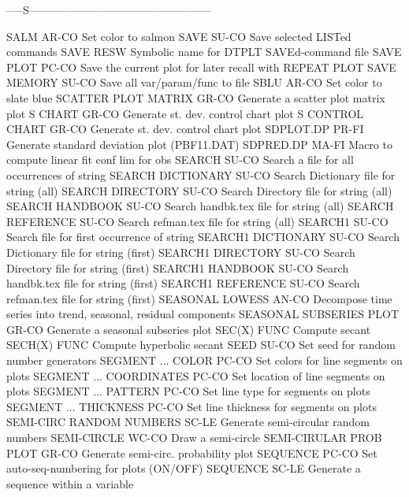 -----S--------------------------------------------------

SALM                        AR-CO Set color to salmon
SAVE                        SU-CO Save selected LISTed commands
SAVE                        RESW  Symbolic name for DTPLT SAVEd-command file
SAVE PLOT                   PC-CO Save the current plot for later recall with REPEAT PLOT
SAVE MEMORY                 SU-CO Save all var/param/func to file
SBLU                        AR-CO Set color to slate blue
SCATTER PLOT MATRIX         GR-CO Generate a scatter plot matrix plot
S CHART                     GR-CO Generate st. dev. control chart plot
S CONTROL CHART             GR-CO Generate st. dev. control chart plot
SDPLOT.DP                   PR-FI Generate standard deviation plot (PBF11.DAT)
SDPRED.DP                   MA-FI Macro to compute linear fit conf lim for obs
SEARCH                      SU-CO Search a file for all occurrences of string
SEARCH DICTIONARY           SU-CO Search Dictionary file for string (all)
SEARCH DIRECTORY            SU-CO Search Directory file for string (all)
SEARCH HANDBOOK             SU-CO Search handbk.tex file for string (all)
SEARCH REFERENCE            SU-CO Search refman.tex file for string (all)
SEARCH1                     SU-CO Search file for first occurrence of string
SEARCH1 DICTIONARY          SU-CO Search Dictionary file for string (first)
SEARCH1 DIRECTORY           SU-CO Search Directory file for string (first)
SEARCH1 HANDBOOK            SU-CO Search handbk.tex file for string (first)
SEARCH1 REFERENCE           SU-CO Search refman.tex file for string (first)
SEASONAL LOWESS             AN-CO Decompose time series into trend, seasonal, residual components
SEASONAL SUBSERIES PLOT     GR-CO Generate a seasonal subseries plot
SEC(X)                      FUNC  Compute secant
SECH(X)                     FUNC  Compute hyperbolic secant
SEED                        SU-CO Set seed for random number generators
SEGMENT ... COLOR           PC-CO Set colors for line segments on plots
SEGMENT ... COORDINATES     PC-CO Set location of line segments on plots
SEGMENT ... PATTERN         PC-CO Set line type for segments on plots
SEGMENT ... THICKNESS       PC-CO Set line thickness for segments on plots
SEMI-CIRC RANDOM NUMBERS    SC-LE Generate semi-circular random numbers
SEMI-CIRCLE                 WC-CO Draw a semi-circle
SEMI-CIRULAR PROB PLOT      GR-CO Generate semi-circ. probability plot
SEQUENCE                    PC-CO Set auto-seq-numbering for plots (ON/OFF)
SEQUENCE                    SC-LE Generate a sequence within a variable
